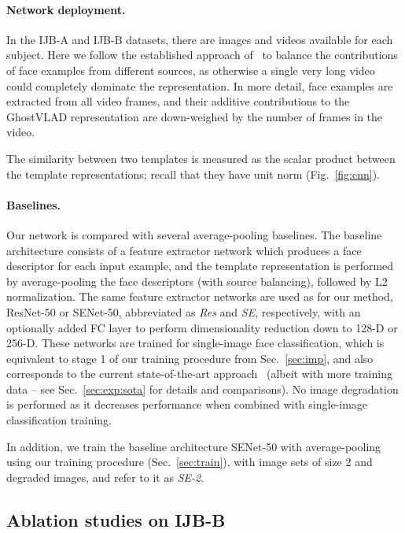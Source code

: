 \documentclass[runningheads]{llncs}
\begin{document}
\paragraph{Network deployment.}
In the IJB-A and IJB-B datasets, there are images and
videos available for each subject.
Here we follow the established approach of~\cite{Cao18,Crosswhite17}
to balance the contributions of face examples from
different sources, as otherwise a single very long video could
completely dominate the representation.
In more detail, face examples are extracted from
all video frames, and their additive contributions
to the GhostVLAD representation are down-weighed by
the number of frames in the video.


The similarity between two templates is measured as the
scalar product between the template representations;
recall that they have unit norm (Fig.~\ref{fig:cnn}).


\paragraph{Baselines.}
Our network is compared with several average-pooling baselines.
The baseline architecture consists of a feature extractor network
which produces a face descriptor for each input example,
and the template representation is performed by
average-pooling the face descriptors
(with source balancing), followed by
L2 normalization.
The same feature extractor networks are used
as for our method, ResNet-50 or SENet-50,
abbreviated as \emph{Res} and \emph{SE}, respectively,
with an optionally added FC layer to perform dimensionality reduction
down to 128-D or 256-D.
These networks are trained for single-image face classification,
which is equivalent to stage 1
of our training procedure from Sec.~\ref{sec:imp},
and also corresponds to the current state-of-the-art
approach~\cite{Cao18} (albeit with more training data
-- see Sec.~\ref{sec:exp:sota} for details and comparisons).
No image degradation is performed as it decreases performance
when combined with single-image classification training.

In addition, we train the baseline architecture SENet-50 with
average-pooling
using our training procedure (Sec.~\ref{sec:train}),
\ie with image sets of size 2 and degraded images,
and refer to it as \emph{SE-2}.



\subsection{Ablation studies on IJB-B}
\end{document}
